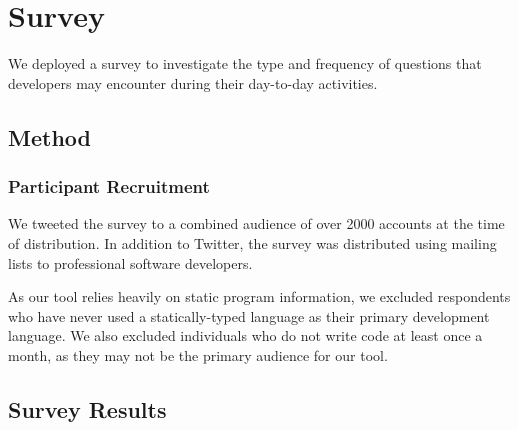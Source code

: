 
\chapter{Survey}
\label{ch:Survey}

\noindent We deployed a survey to investigate the type and frequency of
questions that developers may encounter during their day-to-day activities.


\section{Method}
\label{sec:method}

\subsection{Participant Recruitment}
\label{subsec:ParticipantRecruitment}

\noindent We tweeted the survey to a combined audience of over 2000
accounts at the time of distribution.
In addition to Twitter, the survey was distributed using mailing lists to
professional software developers.

\par As our tool relies heavily on static program information, we excluded
respondents who have never used a statically-typed language as their primary
development language. 
We also excluded individuals who do not write code at least once a month,
as they may not be the primary audience for our tool.

\section{Survey Results}
\label{sec:SurveyResults}


\endinput

